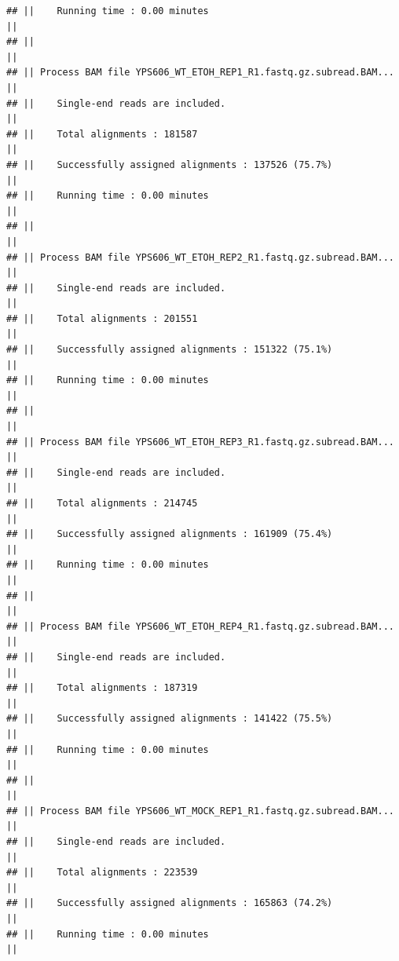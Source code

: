 \documentclass[
]{book}
\begin{document}
\begin{verbatim}
## ||    Running time : 0.00 minutes                                             ||
## ||                                                                            ||
## || Process BAM file YPS606_WT_ETOH_REP1_R1.fastq.gz.subread.BAM...            ||
## ||    Single-end reads are included.                                          ||
## ||    Total alignments : 181587                                               ||
## ||    Successfully assigned alignments : 137526 (75.7%)                       ||
## ||    Running time : 0.00 minutes                                             ||
## ||                                                                            ||
## || Process BAM file YPS606_WT_ETOH_REP2_R1.fastq.gz.subread.BAM...            ||
## ||    Single-end reads are included.                                          ||
## ||    Total alignments : 201551                                               ||
## ||    Successfully assigned alignments : 151322 (75.1%)                       ||
## ||    Running time : 0.00 minutes                                             ||
## ||                                                                            ||
## || Process BAM file YPS606_WT_ETOH_REP3_R1.fastq.gz.subread.BAM...            ||
## ||    Single-end reads are included.                                          ||
## ||    Total alignments : 214745                                               ||
## ||    Successfully assigned alignments : 161909 (75.4%)                       ||
## ||    Running time : 0.00 minutes                                             ||
## ||                                                                            ||
## || Process BAM file YPS606_WT_ETOH_REP4_R1.fastq.gz.subread.BAM...            ||
## ||    Single-end reads are included.                                          ||
## ||    Total alignments : 187319                                               ||
## ||    Successfully assigned alignments : 141422 (75.5%)                       ||
## ||    Running time : 0.00 minutes                                             ||
## ||                                                                            ||
## || Process BAM file YPS606_WT_MOCK_REP1_R1.fastq.gz.subread.BAM...            ||
## ||    Single-end reads are included.                                          ||
## ||    Total alignments : 223539                                               ||
## ||    Successfully assigned alignments : 165863 (74.2%)                       ||
## ||    Running time : 0.00 minutes                                             ||

\end{verbatim}
\end{document}
